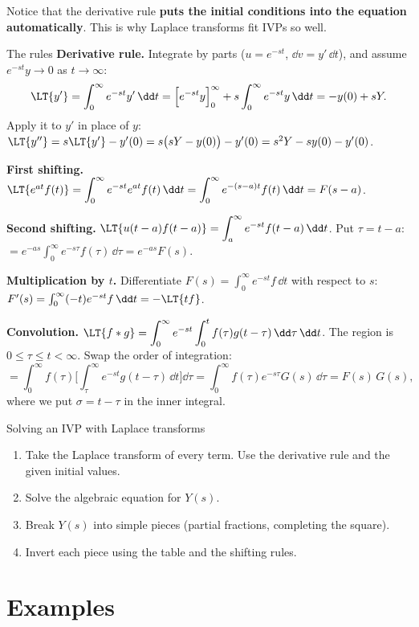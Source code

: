 Notice that the derivative rule \textbf{puts the initial conditions into the equation automatically}. This is why Laplace transforms fit IVPs so well.

\begin{derivbox}{The rules}
\textbf{Derivative rule.} Integrate by parts ($u = e^{-st}$, $\dd v = y'\,\dd t$), and assume $e^{-st}y\to0$ as $t\to\infty$:
\[ \LT\{y'\} = \int_0^\infty e^{-st}y'\,\dd t = \Big[e^{-st}y\Big]_0^\infty + s\int_0^\infty e^{-st}y\,\dd t = -y(0) + sY. \]
Apply it to $y'$ in place of $y$: $\LT\{y''\} = s\LT\{y'\} - y'(0) = s\big(sY - y(0)\big) - y'(0) = s^2Y - sy(0) - y'(0)$.

\textbf{First shifting.} $\LT\{e^{at}f(t)\} = \displaystyle\int_0^\infty e^{-st}e^{at}f(t)\,\dd t = \int_0^\infty e^{-(s-a)t}f(t)\,\dd t = F(s-a)$.

\textbf{Second shifting.} $\LT\{u(t-a)f(t-a)\} = \displaystyle\int_a^\infty e^{-st}f(t-a)\,\dd t$. Put $\tau = t-a$:
$= e^{-as}\displaystyle\int_0^\infty e^{-s\tau}f(\tau)\,\dd\tau = e^{-as}F(s)$.

\textbf{Multiplication by $t$.} Differentiate $F(s) = \int_0^\infty e^{-st}f\,\dd t$ with respect to $s$: $F'(s) = \int_0^\infty(-t)e^{-st}f\,\dd t = -\LT\{tf\}$.

\textbf{Convolution.} $\LT\{f*g\} = \displaystyle\int_0^\infty e^{-st}\int_0^tf(\tau)g(t-\tau)\,\dd\tau\,\dd t$. The region is $0\le\tau\le t<\infty$. Swap the order of integration:
\[ = \int_0^\infty f(\tau)\Big[\int_\tau^\infty e^{-st}g(t-\tau)\,\dd t\Big]\dd\tau = \int_0^\infty f(\tau)e^{-s\tau}G(s)\,\dd\tau = F(s)\,G(s), \]
where we put $\sigma = t - \tau$ in the inner integral.
\end{derivbox}

\begin{methodbox}{Solving an IVP with Laplace transforms}
\begin{enumerate}
  \item Take the Laplace transform of every term. Use the derivative rule and the given initial values.
  \item Solve the algebraic equation for $Y(s)$.
  \item Break $Y(s)$ into simple pieces (partial fractions, completing the square).
  \item Invert each piece using the table and the shifting rules.
\end{enumerate}
\end{methodbox}

\section{Examples}

